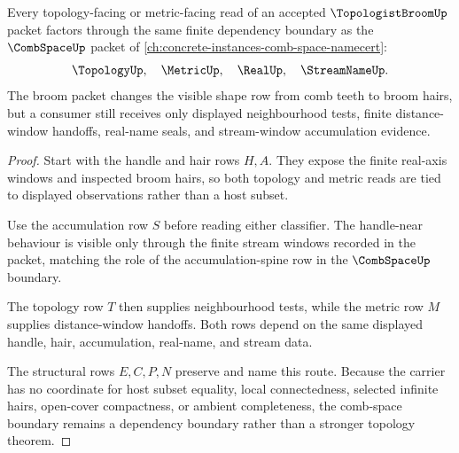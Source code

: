 \begin{theorem}
\label{thm:topologist-broom-comb-space-boundary}
Every topology-facing or metric-facing read of an accepted $\TopologistBroomUp$ packet factors through the same finite dependency boundary as the $\CombSpaceUp$ packet of \autoref{ch:concrete-instances-comb-space-namecert}:
$$
\TopologyUp,\quad
\MetricUp,\quad
\RealUp,\quad
\StreamNameUp .
$$
The broom packet changes the visible shape row from comb teeth to broom hairs, but a consumer still receives only displayed neighbourhood tests, finite distance-window handoffs, real-name seals, and stream-window accumulation evidence.
\end{theorem}
\begin{proof}
Start with the handle and hair rows $H,A$. They expose the finite real-axis windows and inspected broom hairs, so both topology and metric reads are tied to displayed observations rather than a host subset.

Use the accumulation row $S$ before reading either classifier. The handle-near behaviour is visible only through the finite stream windows recorded in the packet, matching the role of the accumulation-spine row in the $\CombSpaceUp$ boundary.

The topology row $T$ then supplies neighbourhood tests, while the metric row $M$ supplies distance-window handoffs. Both rows depend on the same displayed handle, hair, accumulation, real-name, and stream data.

The structural rows $E,C,P,N$ preserve and name this route. Because the carrier has no coordinate for host subset equality, local connectedness, selected infinite hairs, open-cover compactness, or ambient completeness, the comb-space boundary remains a dependency boundary rather than a stronger topology theorem.
\end{proof}


\begin{closurestatus}{\TopologistBroomUp}
  \theoryclosure{\seedClosure}
  \formalstatus{\unformalizedV}
\end{closurestatus}
